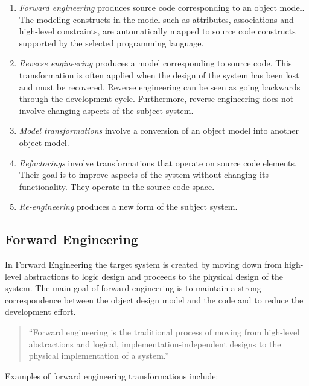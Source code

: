 \begin{enumerate}
\item \textit{Forward engineering} produces source code corresponding to an object model. The modeling constructs in the model such as attributes, associations and high-level constraints, are automatically mapped to source code constructs supported by the selected programming language. 

\item \textit{Reverse engineering} produces a model corresponding to source code. This transformation is often applied when the design of the system has been lost and must be recovered. Reverse engineering can be seen as going backwards through the development cycle. Furthermore, reverse engineering does not involve changing aspects of the subject system. 

\item \textit{Model transformations} involve a conversion of an object model into another object model. 

\item \textit{Refactorings} involve transformations that operate on source code elements. Their goal is to improve aspects of the system without changing its functionality. They operate in the source code space.
\item \textit{Re-engineering} produces a new form of the subject system. 
\end{enumerate}

\subsection{Forward Engineering}

In Forward Engineering the target system is created by moving down from high-level abstractions to logic design and proceeds to the physical design of the system. The main goal of forward engineering is to maintain a strong correspondence between the object design model and the code and to reduce the development effort. 

\begin{quote} 
``Forward engineering is the traditional process of moving from high-level abstractions and logical, implementation-independent designs to the physical implementation of a system.'' \cite{Chikofsky}
\end{quote} 

Examples of forward engineering transformations include:

